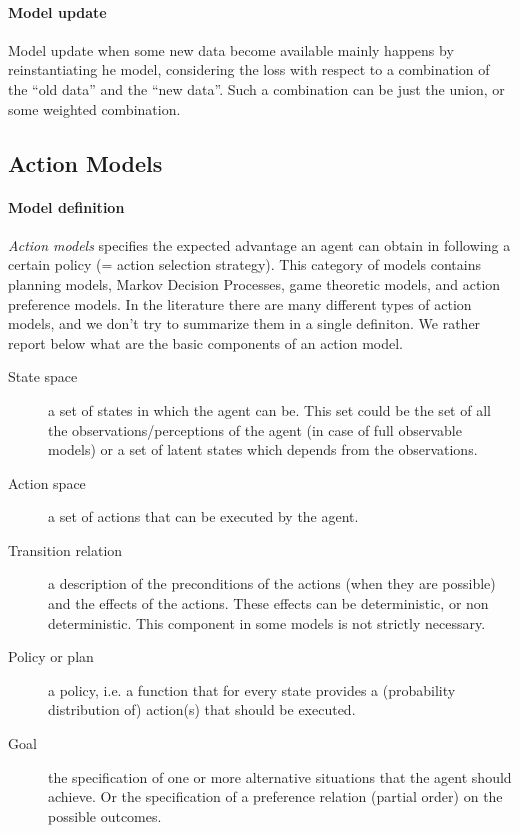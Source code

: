 \paragraph{Model update}
Model update when some new data become available mainly happens by
reinstantiating he model, considering the loss with respect to a
combination of the ``old data'' and the ``new data''. Such a
combination can be just the union, or some weighted combination.

\subsection{Action Models}

  \paragraph{Model definition}
  \emph{Action models} specifies the expected advantage an agent
  can obtain in following a certain policy (= action selection
  strategy). This category of models contains planning models,
  Markov Decision Processes, game theoretic models, and action preference
  models. In the literature there are many different types of action
  models, and we don't try to summarize them in a single definiton. We
  rather report below what are the basic components of an action
  model.

  \begin{description}
  \item[State space] a set of states in which the agent can be. This set could be
    the set of all the observations/perceptions of the agent (in case
    of full observable models) or a set of latent states which depends
    from the observations. 
  \item[Action space] a set of actions that can be executed by the agent. 
  \item[Transition relation] a description of the preconditions of the actions (when they
    are possible) and the effects of the actions. These effects can be
    deterministic, or non deterministic. This component in some models
    is not strictly necessary.
  \item[Policy or plan] a policy, i.e. a function that for every state provides a
    (probability distribution of) action(s) that should be executed.
  \item[Goal] the specification of one or more alternative situations
    that the agent should achieve. Or the specification of a
    preference relation (partial order) on the possible outcomes. 
  \end{description}
  
